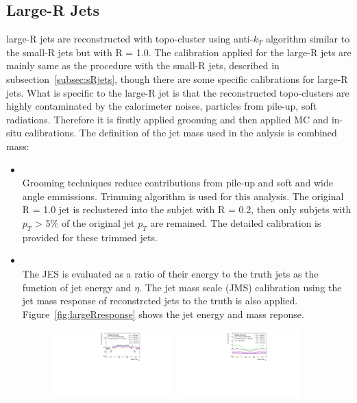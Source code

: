\subsection{Large-R Jets}
large-R jets are reconstructed with topo-cluster using anti-$k_T$ algorithm similar to the small-R jets but with R = 1.0. 
The calibration applied for the large-R jets are mainly same as the procedure with the small-R jets, described in subsection~\ref{subsec:sRjets}, though there are some specific calibrations for large-R jets.
What is specific to the large-R jet is that the reconstructed topo-clusters are highly contaminated by the calorimeter noises, particles from pile-up, soft radiations. Therefore it is firstly applied grooming and then applied MC and in-situ calibrations. The definition of the jet mass used in the anlysis is combined mass:
\begin{itemize}
    \item \textbf{} \\
    Grooming techniques reduce contributions from pile-up and soft and wide angle emmissions. Trimming algorithm \cite{Krohn2010} is used for this analysis. The original R = 1.0 jet is reclustered into the subjet with R = 0.2, then only subjets with $p_T$ > 5\% of the original jet $p_T$ are remained.
    The detailed calibration is provided for these trimmed jets.
    \item \textbf{}\\
    The JES is evaluated as a ratio of their energy to the truth jets as the function of jet energy and $\eta$. The jet mass scale (JMS)  calibration using the jet mass response of reconstrcted jets to the truth is also applied.
    Figure~\ref{fig:largeRresponse} shows the jet energy and mass reponse. 
    \begin{figure}[tbp]
    \begin{center}
    \includegraphics[width=0.45\textwidth,keepaspectratio]{figures/Reconstruction/responsept}
    \includegraphics[width=0.45\textwidth,keepaspectratio]{figures/Reconstruction/responsemass}

\end{center}
\end{figure}
\end{itemize}
